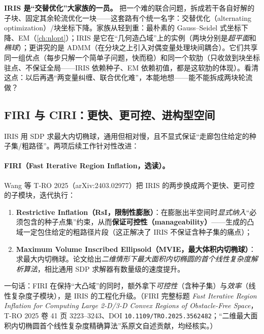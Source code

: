 \begin{insight}
\textbf{IRIS 是“交替优化”大家族的一员。}\;
把一个难的联合问题，拆成若干各自好解的子块、固定其余轮流优化一块——这套路有个统一名字：交替优化（alternating optimization）/块坐标下降。家族从轻到重：最朴素的 Gauss--Seidel 式坐标下降、EM（\cref{ch:nlopt}）；IRIS 是它在“几何造凸域”上的实例（两块分别是\emph{超平面}和\emph{椭球}）；更讲究的是 ADMM（在分块之上引入对偶变量处理块间耦合）。它们共享同一组优点（每步只解一个简单子问题，快而稳）和同一个软肋（只收敛到块坐标驻点、不保证全局——IRIS 依赖种子、EM 依赖初值，都是这软肋的体现）。看清这点：以后再遇“两变量纠缠、联合优化难”，本能地想——能不能拆成两块轮流做？
\end{insight}

\subsection{FIRI 与 CIRI：更快、更可控、进构型空间}
\label{sec:stc-firi-ciri}

IRIS 用 SDP 求最大内切椭球，通用但相对慢，且不显式保证“走廊包住给定的种子集/粗路径”。两项后续工作针对性改进：

\paragraph{FIRI（Fast Iterative Region Inflation，选读）。}
Wang 等 T-RO 2025\cite{wang2025firi}（arXiv:2403.02977）把 IRIS 的两步换成两个更快、更可控的子模块，迭代执行：
\begin{enumerate}
  \item \textbf{Restrictive Inflation（RsI，限制性膨胀）}：在膨胀出半空间时\emph{显式纳入}“必须包含的种子点集”约束，从而\textbf{保证可控性（manageability）}——生成的凸域一定包住给定的粗路径片段（这正解决了 IRIS 不保证含种子集的痛点）；
  \item \textbf{Maximum Volume Inscribed Ellipsoid（MVIE，最大体积内切椭球）}：求最大内切椭球。论文给出\emph{二维情形下最大面积内切椭圆的首个线性复杂度解析算法}，相比通用 SDP 求解器有数量级的速度提升。
\end{enumerate}
一句话：FIRI 在保持“大凸域”的同时，额外拿下\emph{可控性}（含种子集）与\emph{效率}（线性复杂度子模块），是 IRIS 的工程化升级。（FIRI 完整标题 \emph{Fast Iterative Region Inflation for Computing Large 2-D/3-D Convex Regions of Obstacle-Free Space}，T-RO 2025 卷 41 页 3223--3243、DOI \texttt{10.1109/TRO.2025.3562482}；“二维最大面积内切椭圆首个线性复杂度精确算法”系原文自述贡献，均经核实。）

